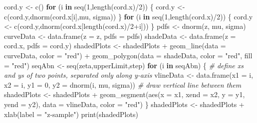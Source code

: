 \documentclass[
]{book}
\newenvironment{Shaded}{\begin{snugshade}}{\end{snugshade}}
\newcommand{\AttributeTok}[1]{\textcolor[rgb]{0.77,0.63,0.00}{#1}}
\newcommand{\CommentTok}[1]{\textcolor[rgb]{0.56,0.35,0.01}{\textit{#1}}}
\newcommand{\ControlFlowTok}[1]{\textcolor[rgb]{0.13,0.29,0.53}{\textbf{#1}}}
\newcommand{\DecValTok}[1]{\textcolor[rgb]{0.00,0.00,0.81}{#1}}
\newcommand{\FunctionTok}[1]{\textcolor[rgb]{0.00,0.00,0.00}{#1}}
\newcommand{\NormalTok}[1]{#1}
\newcommand{\OtherTok}[1]{\textcolor[rgb]{0.56,0.35,0.01}{#1}}
\newcommand{\SpecialCharTok}[1]{\textcolor[rgb]{0.00,0.00,0.00}{#1}}
\newcommand{\StringTok}[1]{\textcolor[rgb]{0.31,0.60,0.02}{#1}}
\begin{document}
\begin{Shaded}
\begin{Highlighting}[]
\NormalTok{cord.y }\OtherTok{\textless{}{-}} \FunctionTok{c}\NormalTok{()}
\ControlFlowTok{for}\NormalTok{ (i }\ControlFlowTok{in} \FunctionTok{seq}\NormalTok{(}\DecValTok{1}\NormalTok{,}\FunctionTok{length}\NormalTok{(cord.x)}\SpecialCharTok{/}\DecValTok{2}\NormalTok{)) \{}
\NormalTok{  cord.y }\OtherTok{\textless{}{-}} \FunctionTok{c}\NormalTok{(cord.y,}\FunctionTok{dnorm}\NormalTok{(cord.x[i],mu, sigma))}
\NormalTok{\}}
\ControlFlowTok{for}\NormalTok{ (i }\ControlFlowTok{in} \FunctionTok{seq}\NormalTok{(}\DecValTok{1}\NormalTok{,}\FunctionTok{length}\NormalTok{(cord.x)}\SpecialCharTok{/}\DecValTok{2}\NormalTok{)) \{}
\NormalTok{  cord.y }\OtherTok{\textless{}{-}} \FunctionTok{c}\NormalTok{(cord.y,}\FunctionTok{dnorm}\NormalTok{(cord.x[}\FunctionTok{length}\NormalTok{(cord.x)}\SpecialCharTok{/}\DecValTok{2}\SpecialCharTok{+}\NormalTok{i]))}
\NormalTok{\}}
\NormalTok{pdfs }\OtherTok{\textless{}{-}} \FunctionTok{dnorm}\NormalTok{(z, mu, sigma)}
\NormalTok{curveData }\OtherTok{\textless{}{-}} \FunctionTok{data.frame}\NormalTok{(}\AttributeTok{z =}\NormalTok{ z, }\AttributeTok{pdfs =}\NormalTok{ pdfs)}
\NormalTok{shadeData }\OtherTok{\textless{}{-}} \FunctionTok{data.frame}\NormalTok{(}\AttributeTok{z =}\NormalTok{ cord.x, }\AttributeTok{pdfs =}\NormalTok{ cord.y)}
\NormalTok{shadedPlots }\OtherTok{\textless{}{-}}\NormalTok{ shadedPlots }\SpecialCharTok{+} 
  \FunctionTok{geom\_line}\NormalTok{(}\AttributeTok{data =}\NormalTok{ curveData, }\AttributeTok{color =} \StringTok{"red"}\NormalTok{) }\SpecialCharTok{+} 
  \FunctionTok{geom\_polygon}\NormalTok{(}\AttributeTok{data =}\NormalTok{ shadeData, }\AttributeTok{color =} \StringTok{"red"}\NormalTok{, }\AttributeTok{fill =} \StringTok{"red"}\NormalTok{)}
\NormalTok{seqAbn }\OtherTok{\textless{}{-}} \FunctionTok{seq}\NormalTok{(zeta,upperLimit,step)}
\ControlFlowTok{for}\NormalTok{ (i }\ControlFlowTok{in}\NormalTok{ seqAbn) \{}
  \CommentTok{\# define xs and ys of two points, separated only along y{-}axis}
\NormalTok{  vlineData }\OtherTok{\textless{}{-}} \FunctionTok{data.frame}\NormalTok{(}\AttributeTok{x1 =}\NormalTok{ i, }
                          \AttributeTok{x2 =}\NormalTok{ i, }
                          \AttributeTok{y1 =} \DecValTok{0}\NormalTok{, }
                          \AttributeTok{y2 =} \FunctionTok{dnorm}\NormalTok{(i, mu, sigma))}
  \CommentTok{\# draw vertical line between them}
\NormalTok{  shadedPlots }\OtherTok{\textless{}{-}}\NormalTok{ shadedPlots }\SpecialCharTok{+} 
    \FunctionTok{geom\_segment}\NormalTok{(}\FunctionTok{aes}\NormalTok{(}\AttributeTok{x =}\NormalTok{ x1, }\AttributeTok{xend =}\NormalTok{ x2, }\AttributeTok{y =}\NormalTok{ y1, }\AttributeTok{yend =}\NormalTok{ y2), }
                 \AttributeTok{data =}\NormalTok{ vlineData, }\AttributeTok{color =} \StringTok{"red"}\NormalTok{)}
\NormalTok{\}}
\NormalTok{shadedPlots }\OtherTok{\textless{}{-}}\NormalTok{ shadedPlots }\SpecialCharTok{+} \FunctionTok{xlab}\NormalTok{(}\AttributeTok{label =} \StringTok{"z{-}sample"}\NormalTok{)}
\FunctionTok{print}\NormalTok{(shadedPlots)}
\end{Highlighting}
\end{Shaded}
\end{document}
